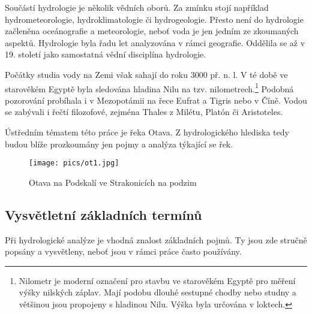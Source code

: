 \documentclass[thesis=M,czech]{FITthesis}[2012/06/26]
\begin{document}
Součástí hydrologie je několik vědních oborů. Za zmínku stojí například hydrometeorologie, hydroklimatologie či hydrogeologie. Přesto není do hydrologie začleněna oceánografie a meteorologie, neboť voda je jen jedním ze zkoumaných aspektů. Hydrologie byla řadu let analyzována v rámci geografie. Oddělila se až v 19. století jako samostatná vědní disciplína hydrologie. 

Počátky studia vody na Zemi však sahají do roku 3000 př. n. l. V té době ve starověkém Egyptě byla sledována hladina Nilu na tzv. nilometrech.\footnote{Nilometr je moderní označení pro stavbu ve starověkém Egyptě pro měření výšky nilských záplav. Mají podobu dlouhé sestupné chodby nebo studny a většinou jsou propojeny s hladinou Nilu. Výška byla určována v loktech.} Podobná pozorování probíhala i v Mezopotámii na řece Eufrat a Tigris nebo v Číně. Vodou se zabývali i řečtí filozofové, zejména Thales z Milétu, Platón či Aristoteles. 


Ústředním tématem této práce je řeka Otava. Z hydrologického hlediska tedy budou blíže prozkoumány jen pojmy a analýza týkající se řek. \cite{definiceHydro} \cite{FGkniha} \cite{hydro_net}


\begin{figure}[h!]
	\centering
	\texttt{[image: pics/ot1.jpg]}
	\caption{Otava na Podskalí ve Strakonicích na podzim}
	\label{obrazek:ot1}
\end{figure}


\subsection{Vysvětletní základních termínů}
Při hydrologické analýze je vhodná znalost základních pojmů. Ty jsou zde stručně popsány a vysvětleny, neboť jsou v rámci práce často používány. \cite{terminy}
\end{document}
